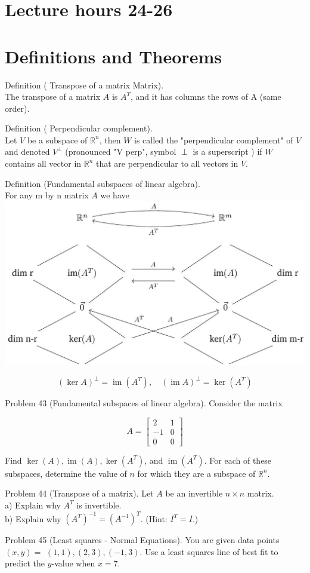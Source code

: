 \documentclass[10pt]{article}
\begin{document}
\section*{Lecture hours 24-26}
\section*{Definitions and Theorems}
Definition ( Transpose of a matrix Matrix).\\
The transpose of a matrix $A$ is $A^{T}$, and it has columns the rows of A (same order).

Definition ( Perpendicular complement).\\
Let $V$ be a subspace of $\mathbb{R}^{n}$, then $W$ is called the "perpendicular complement" of $V$ and denoted $V^{\perp}$ (pronounced "V perp", symbol $\perp$ is a superscript ) if $W$ contains all vector in $\mathbb{R}^{n}$ that are perpendicular to all vectors in $V$.

Definition (Fundamental subspaces of linear algebra).\\
For any m by n matrix $A$ we have\\
\includegraphics[max width=\textwidth, center]{2024_12_26_f858c68a27e2c0f87aabg-1}

$$
(\operatorname{ker} A)^{\perp}=\operatorname{im}\left(A^{T}\right), \quad(\operatorname{im} A)^{\perp}=\operatorname{ker}\left(A^{T}\right)
$$

Problem 43 (Fundamental subspaces of linear algebra). Consider the matrix

$$
A=\left[\begin{array}{cc}
2 & 1 \\
-1 & 0 \\
0 & 0
\end{array}\right]
$$

Find $\operatorname{ker}(A), \operatorname{im}(A), \operatorname{ker}\left(A^{T}\right)$, and $\operatorname{im}\left(A^{T}\right)$. For each of these subspaces, determine the value of $n$ for which they are a subspace of $\mathbb{R}^{n}$.

Problem 44 (Transpose of a matrix). Let $A$ be an invertible $n \times n$ matrix.\\
a) Explain why $A^{T}$ is invertible.\\
b) Explain why $\left(A^{T}\right)^{-1}=\left(A^{-1}\right)^{T}$. (Hint: $I^{T}=I$.)

Problem 45 (Least squares - Normal Equations). You are given data points $(x, y)=$ $(1,1),(2,3),(-1,3)$. Use a least squares line of best fit to predict the $y$-value when $x=7$.
\end{document}

